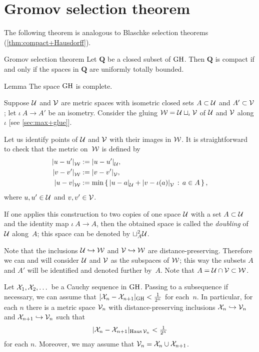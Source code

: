 \section{Gromov selection theorem}

The following theorem is analogous to Blaschke selection theorems (\ref{thm:compact+Hausdorff}).

\begin{thm}{Gromov selection theorem}\label{thm:gromov-compactness}
Let $\bm{Q}$ be a closed subset of $\operatorname{\rm GH}\nolimits$.
Then $\bm{Q}$ is compact if and only if the spaces in $\bm{Q}$ are uniformly totally bounded.
\end{thm}

\begin{thm}{Lemma}\label{lem:GH-complete}
The space $\operatorname{\rm GH}\nolimits$ is complete.
\end{thm}

Suppose 
$\mathcal{U}$ and $\mathcal{V}$ are metric spaces 
with isometric closed sets $A\subset\mathcal{U}$ and $A'\subset\mathcal{V}$;
let $\iota\:A\to A'$ be an isometry.
Consider the gluing $\mathcal{W}=\mathcal{U}\sqcup_\iota\mathcal{V}$ of $\mathcal{U}$ and $\mathcal{V}$ along $\iota$ [see \ref{sec:max+glue}].

Let us identify points of $\mathcal{U}$ and $\mathcal{V}$ with their images in $\mathcal{W}$.
It is straightforward to check that the metric on~$\mathcal{W}$ is defined by
\begin{align*}
\dist{u}{u'}{\spc{W}}&\df\dist{u}{u'}{\spc{U}},
\\
\dist{v}{v'}{\spc{W}}&\df\dist{v}{v'}{\spc{V}},
\\
\dist{u}{v}{\spc{W}}&\df\min\set{\dist{u}{a}{\spc{U}}+\dist{v}{\iota(a)}{\spc{V}}}{a\in A},
\end{align*}
where $u,u'\in \mathcal{U}$ and $v,v'\in \mathcal{V}$.

If one applies this construction to two copies of one space $\mathcal{U}$ with a set $A\subset \mathcal{U}$ and the identity map $\iota\:A\to A$, then the obtained space is called the \emph{doubling} of $\mathcal{U}$ along~$A$; this space can be denoted by $\sqcup_A^2\mathcal{U}$.

Note that the inclusions $\mathcal{U}\hookrightarrow \mathcal{W}$ and $\mathcal{V}\hookrightarrow \mathcal{W}$ are distance-preserving.
Therefore we can and will consider $\mathcal{U}$ and $\mathcal{V}$ as the subspaces of $\mathcal{W}$;
this way the subsets $A$ and $A'$ will be identified and denoted further by~$A$.
Note that $A=\mathcal{U}\cap \mathcal{V}\subset \mathcal{W}$.

Let $\mathcal{X}_1,\mathcal{X}_2,\dots$ be a Cauchy sequence in $\operatorname{\rm GH}\nolimits$.
Passing to a subsequence if necessary, 
we can assume that $|\mathcal{X}_n-\mathcal{X}_{n+1}|_{\operatorname{\rm GH}\nolimits}<\tfrac1{2^n}$ for each~$n$.
In particular, for each $n$ there is a metric space $\mathcal{V}_n$ with distance-preserving inclusions $\mathcal{X}_n\hookrightarrow \mathcal{V}_n$ and $\mathcal{X}_{n+1}\hookrightarrow \mathcal{V}_n$ such that
\[|\mathcal{X}_n-\mathcal{X}_{n+1}|_{\operatorname{\rm Haus}\nolimits\mathcal{V}_n}<\tfrac1{2^n}\]
for each $n$.
Moreover, we may assume that $\mathcal{V}_n=\mathcal{X}_n\cup\mathcal{X}_{n+1}$.

